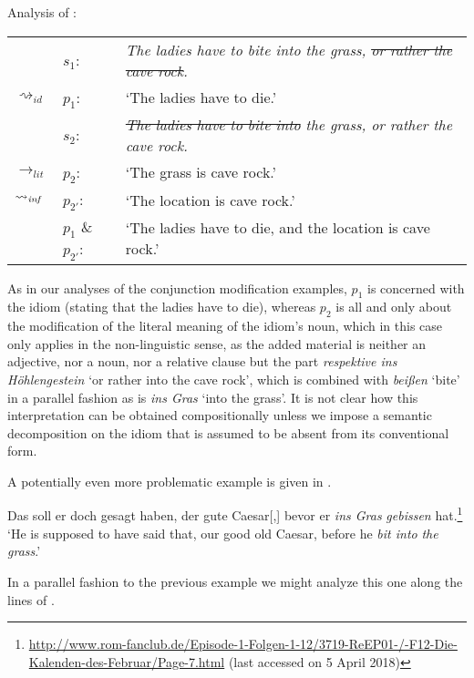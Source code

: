 \documentclass[output=paper]{langsci/langscibook}
\begin{document}
\ea \label{analysis cave rock} 
Analysis of :\smallskip\\
\begin{tabularx}{\linewidth}[t]{@{}llQ@{}}
& 	$s_{1}$: & \textit{The ladies have to bite into the grass, \sout{or rather the cave rock}.} \\
$\rightsquigarrow_{id}$	&	$p_{1}$: & `The ladies have to die.' \medskip\\
& 	$s_{2}$: & \textit{\sout{The ladies have to bite into} the grass, or rather the cave rock.} \\
$\rightarrow_{lit}$&	$p_{2}$: & `The grass is cave rock.' \\
$\rightsquigarrow_{\text{\itshape inf}}$	&	$p_{2'}$: & `The location is cave rock.' \medskip\\
&	$p_{1}$ \& $p_{2'}$: & `The ladies have to die, and the location is cave rock.' 
\end{tabularx}
\z

\noindent As in our analyses of the conjunction modification examples, $p_{1}$ is concerned with the idiom (stating that the ladies have to die), whereas $p_{2}$ is all and only about the modification of the literal meaning of the idiom's noun, which in this case only applies in the non-linguistic sense, as the added material is neither an adjective, nor a noun, nor a relative clause but the part \textit{respektive ins Höhlengestein} `or rather into the cave rock', which is combined with \textit{beißen} `bite' in a parallel fashion as is \textit{ins Gras} `into the grass'. It is not clear how this interpretation can be obtained compositionally unless we impose a semantic decomposition on the idiom that is assumed to be absent from its conventional form.

A potentially even more problematic example is given in .

\ea \label{marble floor}
Das soll er doch gesagt haben, der gute Caesar[,] bevor er \underline{} \textit{ins Gras} \underline{} \textit{gebissen} hat.\footnote{\url{http://www.rom-fanclub.de/Episode-1-Folgen-1-12/3719-ReEP01-/-F12-Die-Kalenden-des-Februar/Page-7.html} (last accessed on 5 April 2018)}
\glt `He is supposed to have said that, our good old Caesar, before he \textit{bit into} \underline{} \textit{the grass}.' 
\z

\noindent In a parallel fashion to the previous example we might analyze this one along the lines of .
\end{document}
